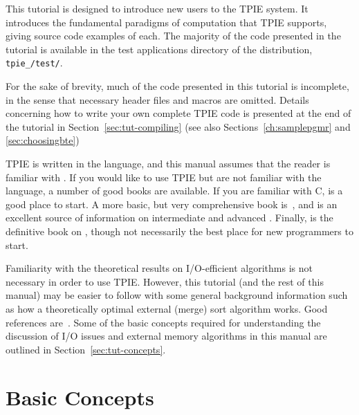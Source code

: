 This tutorial is designed to introduce new users to the TPIE system.
It introduces the fundamental paradigms of computation that TPIE
supports, giving source code examples of each.  The majority of the
code presented in the tutorial is available in the test
applications directory of the distribution, 
\texttt{tpie\_\version/test/}.

For the sake of brevity, much of the code presented in this tutorial is
incomplete, in the sense that necessary header files 
and macros are omitted. Details concerning how to write your
own complete TPIE code is presented at the end of the tutorial in
Section~\ref{sec:tut-compiling} (see also Sections~\ref{ch:samplepgmr} and
\ref{sec:choosingbte})

TPIE is written in the \CPP{} language, and this manual assumes
that the reader is familiar with \CPP{}.  If you would like to
use TPIE but are not familiar with the \CPP{}
language, a number of good books are available. If you are
familiar with C, \cite{pohl:c++} is a good place to
start. A more basic, but very comprehensive book
is~\cite{deitel:c++}, and \cite{meyers:effective} is an
excellent source of information on intermediate and advanced
\CPP{}.  Finally, \cite{ellis:arm} is the definitive book on
\CPP{}, though not necessarily the best place for new
programmers to start.

Familiarity with the theoretical results on I/O-efficient
algorithms is not necessary in order to use TPIE. However,
this tutorial (and the rest of this manual) may be easier to
follow with some general background information such as how
a theoretically optimal external (merge) sort algorithm
works. Good references
are~\cite{vitter:podssurvey,arge:gisbook,aggarwal:input}.
Some of the basic concepts required for understanding the
discussion of I/O issues and external memory algorithms in
this manual are outlined in Section~\ref{sec:tut-concepts}.

\section{Basic Concepts}
   
